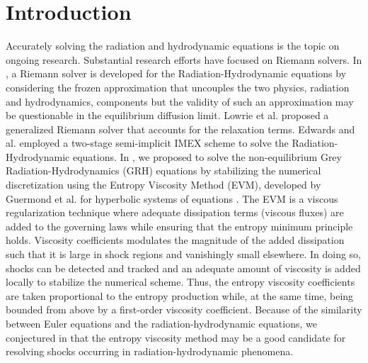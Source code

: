 \documentclass{mc2015}
\begin{document}
\section{Introduction}\label{sec:intro}
%
Accurately solving the radiation and hydrodynamic equations is the topic on ongoing research. 
Substantial research efforts have focused on Riemann solvers. In
\cite{Balsara},  a Riemann solver is developed for the Radiation-Hydrodynamic equations by considering the frozen approximation 
that uncouples the two physics, radiation and hydrodynamics, components but the validity of such an approximation may be questionable 
in the equilibrium diffusion limit. 
Lowrie et al. \cite{LowrieMorelHittinger} proposed a generalized Riemann solver that accounts for the relaxation terms. 
Edwards and al. \cite{EdwardsMorelLowrie} employed a two-stage semi-implicit IMEX scheme to solve the Radiation-Hydrodynamic equations. 
%
%
In \cite{our_jcp_radhy_paper}, we proposed to solve the non-equilibrium Grey Radiation-Hydrodynamics (GRH) equations by stabilizing the numerical discretization 
using the Entropy Viscosity Method (EVM), developed by Guermond et al. for hyperbolic systems of equations \cite{jlg1, jlg2}. 
%
The EVM is a viscous regularization technique where adequate dissipation terms (viscous fluxes) are added to the governing laws while ensuring 
that the entropy minimum principle holds. Viscosity coefficients modulates the magnitude of the added dissipation such that it is large in shock regions and vanishingly 
small elsewhere. In doing so, shocks can be detected and tracked and an adequate amount of viscosity is added locally to stabilize the numerical scheme. 
Thus, the entropy viscosity coefficients are taken proportional to the entropy production while, at the same time, being bounded from above by a first-order 
viscosity coefficient.
Because of the similarity between Euler equations and the radiation-hydrodynamic equations, we conjectured in \cite{our_jcp_radhy_paper} that the entropy 
viscosity method may be a good candidate for resolving shocks occurring in radiation-hydrodynamic phenomena.
\end{document}
